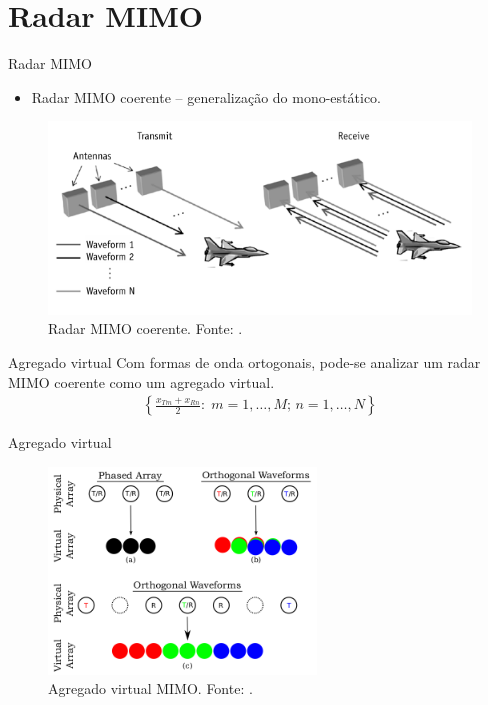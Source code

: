 \documentclass[portuguese]{beamer}
\begin{document}
\section{Radar MIMO}

\begin{frame}{Radar MIMO}
  \begin{itemize}
	\item Radar MIMO coerente -- generalização do mono-estático.
  \end{itemize}
  \begin{figure}[]
	\centering
	\includegraphics[width=0.7\linewidth]{../report/graphics/concept.png}
	\caption{Radar MIMO coerente. Fonte: \cite{mimoradarbook}.}
	\label{fig:concept}
  \end{figure}
\end{frame}

\begin{frame}{Agregado virtual}
  Com formas de onda ortogonais, pode-se analizar um radar MIMO coerente como um agregado virtual.
  \begin{align*}
    \left\{ \frac{x_{Tm}+x_{Rn}}{2}:\; m=1,\ldots,M;\,n=1,\ldots,N \right\}
  \end{align*}
\end{frame}

\begin{frame}{Agregado virtual}
  \begin{figure}[]
	\centering
	\includegraphics[height=5.5cm]{../report/graphics/virt1.png}
	\caption{Agregado virtual MIMO. Fonte: \cite{davis2015mimo}.}
	\label{fig:virt1}
  \end{figure}
\end{frame}
\end{document}
